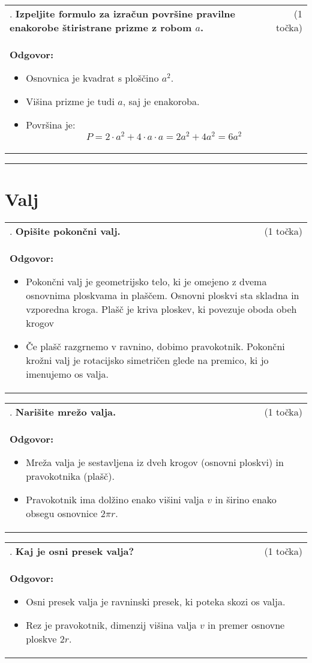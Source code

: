\documentclass[12pt]{article}
\newcounter{vprasanje}[section]
\renewcommand{\thevprasanje}{\roman{vprasanje}}
\newcommand{\vprasanje}[2]{%
  \stepcounter{vprasanje}%
  \textbf{\thevprasanje}. \textbf{#1} & (#2) \\
}
\newcommand{\odgovor}[1]{%
  \multicolumn{2}{p{\dimexpr\textwidth-2\tabcolsep\relax}}{%
    \small \textbf{Odgovor:} #1%
  } \\[1em]%
}
\newcommand{\crta}{\rule{\textwidth}{0.4pt}}
\newcommand{\naslov}[1]{%
  \vspace{1em} 
  \section{#1}
  \addcontentsline{toc}{section}{\protect\numberline{}#1}%
}
\newcommand{\razmak}[1]{%
  \vspace{#1}
}
\begin{document}
\razmak{1em}

\begin{tabularx}{\textwidth}{X r}
\vprasanje{Izpeljite formulo za izračun površine pravilne enakorobe štiristrane prizme z robom $a$.}{1 točka}
\odgovor{
\begin{itemize}
  \item Osnovnica je kvadrat s ploščino $a^2$.
  \item Višina prizme je tudi $a$, saj je enakoroba.
  \item Površina je:
  \[
  P = 2 \cdot a^2 + 4 \cdot a \cdot a = 2a^2 + 4a^2 = 6a^2
  \]
\end{itemize}
}
\end{tabularx}

\razmak{0.5em}


\crta

\naslov{Valj}

\begin{tabularx}{\textwidth}{X r}
\vprasanje{Opišite pokončni valj.}{1 točka}
\odgovor{
\begin{itemize}
  \item Pokončni valj je geometrijsko telo, ki je omejeno z dvema osnovnima ploskvama in plaščem. Osnovni ploskvi sta skladna in vzporedna kroga. Plašč je kriva ploskev, ki povezuje oboda obeh krogov
  \item Če plašč razgrnemo v ravnino, dobimo pravokotnik. Pokončni krožni valj je rotacijsko simetričen glede na premico, ki jo imenujemo os valja.
\end{itemize}
}
\end{tabularx}

\begin{tabularx}{\textwidth}{X r}
\vprasanje{Narišite mrežo valja.}{1 točka}
\odgovor{
\begin{itemize}
  \item Mreža valja je sestavljena iz dveh krogov (osnovni ploskvi) in pravokotnika (plašč).
  \item Pravokotnik ima dolžino enako višini valja $v$ in širino enako obsegu osnovnice $2\pi r$.
\end{itemize}
}
\end{tabularx}

\begin{tabularx}{\textwidth}{X r}
\vprasanje{Kaj je osni presek valja?}{1 točka}
\odgovor{
\begin{itemize}
  \item Osni presek valja je ravninski presek, ki poteka skozi os valja.
  \item Rez je pravokotnik, dimenzij višina valja $v$ in premer osnovne ploskve $2r$.
\end{itemize}
}
\end{tabularx}
\end{document}
